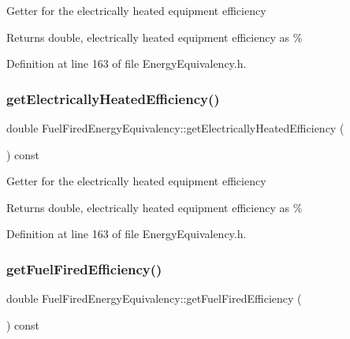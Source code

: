 Getter for the electrically heated equipment efficiency

\begin{DoxyReturn}{Returns}
double, electrically heated equipment efficiency as \% 
\end{DoxyReturn}


Definition at line 163 of file Energy\+Equivalency.\+h.

\mbox{\label{class_fuel_fired_energy_equivalency_ad4bd750677313895d8345c7eaf8308bd}} 
\subsubsection{\texorpdfstring{get\+Electrically\+Heated\+Efficiency()}{getElectricallyHeatedEfficiency()}\hspace{0.1cm}{\footnotesize\ttfamily [3/3]}}
{\footnotesize\ttfamily double Fuel\+Fired\+Energy\+Equivalency\+::get\+Electrically\+Heated\+Efficiency (\begin{DoxyParamCaption}{ }\end{DoxyParamCaption}) const\hspace{0.3cm}{\ttfamily [inline]}}

Getter for the electrically heated equipment efficiency

\begin{DoxyReturn}{Returns}
double, electrically heated equipment efficiency as \% 
\end{DoxyReturn}


Definition at line 163 of file Energy\+Equivalency.\+h.

\mbox{\label{class_fuel_fired_energy_equivalency_ac8695c1fe3dcffeab60b5305239d2a58}} 
\subsubsection{\texorpdfstring{get\+Fuel\+Fired\+Efficiency()}{getFuelFiredEfficiency()}\hspace{0.1cm}{\footnotesize\ttfamily [1/3]}}
{\footnotesize\ttfamily double Fuel\+Fired\+Energy\+Equivalency\+::get\+Fuel\+Fired\+Efficiency (\begin{DoxyParamCaption}{ }\end{DoxyParamCaption}) const\hspace{0.3cm}{\ttfamily [inline]}}

